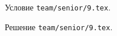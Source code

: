 \problem{}
Условие \texttt{team/senior/9.tex}.

\solution Решение \texttt{team/senior/9.tex}.
\endproblem
